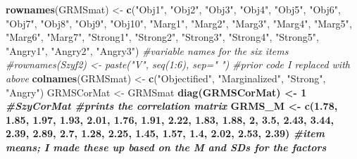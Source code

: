 \documentclass[
  english,
]{book}
\newenvironment{Shaded}{\begin{snugshade}}{\end{snugshade}}
\newcommand{\CommentTok}[1]{\textcolor[rgb]{0.56,0.35,0.01}{\textit{#1}}}
\newcommand{\DecValTok}[1]{\textcolor[rgb]{0.00,0.00,0.81}{#1}}
\newcommand{\FloatTok}[1]{\textcolor[rgb]{0.00,0.00,0.81}{#1}}
\newcommand{\KeywordTok}[1]{\textcolor[rgb]{0.13,0.29,0.53}{\textbf{#1}}}
\newcommand{\NormalTok}[1]{#1}
\newcommand{\OperatorTok}[1]{\textcolor[rgb]{0.81,0.36,0.00}{\textbf{#1}}}
\newcommand{\StringTok}[1]{\textcolor[rgb]{0.31,0.60,0.02}{#1}}
\begin{document}
\begin{Shaded}
\begin{Highlighting}[]
\KeywordTok{rownames}\NormalTok{(GRMSmat) <-}\StringTok{ }\KeywordTok{c}\NormalTok{(}\StringTok{"Obj1"}\NormalTok{, }\StringTok{"Obj2"}\NormalTok{, }\StringTok{"Obj3"}\NormalTok{, }\StringTok{"Obj4"}\NormalTok{, }\StringTok{"Obj5"}\NormalTok{, }\StringTok{"Obj6"}\NormalTok{, }\StringTok{"Obj7"}\NormalTok{, }\StringTok{"Obj8"}\NormalTok{, }\StringTok{"Obj9"}\NormalTok{, }\StringTok{"Obj10"}\NormalTok{, }\StringTok{"Marg1"}\NormalTok{, }\StringTok{"Marg2"}\NormalTok{, }\StringTok{"Marg3"}\NormalTok{, }\StringTok{"Marg4"}\NormalTok{, }\StringTok{"Marg5"}\NormalTok{, }\StringTok{"Marg6"}\NormalTok{, }\StringTok{"Marg7"}\NormalTok{, }\StringTok{"Strong1"}\NormalTok{, }\StringTok{"Strong2"}\NormalTok{, }\StringTok{"Strong3"}\NormalTok{, }\StringTok{"Strong4"}\NormalTok{, }\StringTok{"Strong5"}\NormalTok{, }\StringTok{"Angry1"}\NormalTok{, }\StringTok{"Angry2"}\NormalTok{, }\StringTok{"Angry3"}\NormalTok{) }\CommentTok{#variable names for the six items}
\CommentTok{#rownames(Szyf2) <- paste("V", seq(1:6), sep=" ") #prior code I replaced with above}
\KeywordTok{colnames}\NormalTok{(GRMSmat) <-}\StringTok{ }\KeywordTok{c}\NormalTok{(}\StringTok{"Objectified"}\NormalTok{, }\StringTok{"Marginalized"}\NormalTok{, }\StringTok{"Strong"}\NormalTok{, }\StringTok{"Angry"}\NormalTok{)}
\NormalTok{GRMSCorMat <-}\StringTok{ }\NormalTok{GRMSmat }\OperatorTok{%
\KeywordTok{diag}\NormalTok{(GRMSCorMat) <-}\StringTok{ }\DecValTok{1}
\CommentTok{#SzyCorMat #prints the correlation matrix}
\NormalTok{GRMS_M <-}\StringTok{ }\KeywordTok{c}\NormalTok{(}\FloatTok{1.78}\NormalTok{,   }\FloatTok{1.85}\NormalTok{,   }\FloatTok{1.97}\NormalTok{,   }\FloatTok{1.93}\NormalTok{,   }\FloatTok{2.01}\NormalTok{,   }\FloatTok{1.76}\NormalTok{,   }\FloatTok{1.91}\NormalTok{,   }\FloatTok{2.22}\NormalTok{,   }\FloatTok{1.83}\NormalTok{,   }\FloatTok{1.88}\NormalTok{, }\DecValTok{2}\NormalTok{,    }\FloatTok{3.5}\NormalTok{,    }\FloatTok{2.43}\NormalTok{,   }\FloatTok{3.44}\NormalTok{,   }\FloatTok{2.39}\NormalTok{,   }\FloatTok{2.89}\NormalTok{,   }\FloatTok{2.7}\NormalTok{, }\FloatTok{1.28}\NormalTok{,  }\FloatTok{2.25}\NormalTok{,   }\FloatTok{1.45}\NormalTok{,   }\FloatTok{1.57}\NormalTok{,   }\FloatTok{1.4}\NormalTok{, }\FloatTok{2.02}\NormalTok{,  }\FloatTok{2.53}\NormalTok{,   }\FloatTok{2.39}\NormalTok{) }\CommentTok{#item means; I made these up based on the M and SDs for the factors}
}
\end{Highlighting}
\end{Shaded}
\end{document}
